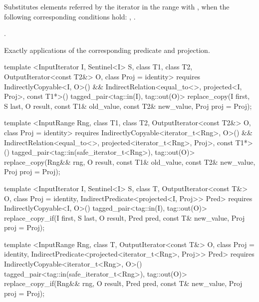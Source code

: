\begin{itemdescr}
\pnum
\effects
Substitutes elements referred by the iterator
in the range 
with ,
when the following corresponding conditions hold:
,
.

\pnum
\returns
{}.

\pnum
\complexity
Exactly
applications of the corresponding predicate and projection.
\end{itemdescr}

%
%
\begin{itemdecl}
template <InputIterator I, Sentinel<I> S, class T1, class T2, OutputIterator<const T2&> O,
    class Proj = identity>
  requires IndirectlyCopyable<I, O>() &&
    IndirectRelation<equal_to<>, projected<I, Proj>, const T1*>()
  tagged_pair<tag::in(I), tag::out(O)>
    replace_copy(I first, S last, O result, const T1& old_value, const T2& new_value,
                 Proj proj = Proj{});

template <InputRange Rng, class T1, class T2, OutputIterator<const T2&> O,
    class Proj = identity>
  requires IndirectlyCopyable<iterator_t<Rng>, O>() &&
    IndirectRelation<equal_to<>, projected<iterator_t<Rng>, Proj>, const T1*>()
  tagged_pair<tag::in(safe_iterator_t<Rng>), tag::out(O)>
    replace_copy(Rng&& rng, O result, const T1& old_value, const T2& new_value,
                 Proj proj = Proj{});

template <InputIterator I, Sentinel<I> S, class T, OutputIterator<const T&> O,
    class Proj = identity, IndirectPredicate<projected<I, Proj>> Pred>
  requires IndirectlyCopyable<I, O>()
  tagged_pair<tag::in(I), tag::out(O)>
    replace_copy_if(I first, S last, O result, Pred pred, const T& new_value,
                    Proj proj = Proj{});

template <InputRange Rng, class T, OutputIterator<const T&> O, class Proj = identity,
    IndirectPredicate<projected<iterator_t<Rng>, Proj>> Pred>
  requires IndirectlyCopyable<iterator_t<Rng>, O>()
  tagged_pair<tag::in(safe_iterator_t<Rng>), tag::out(O)>
    replace_copy_if(Rng&& rng, O result, Pred pred, const T& new_value,
                    Proj proj = Proj{});
\end{itemdecl}

